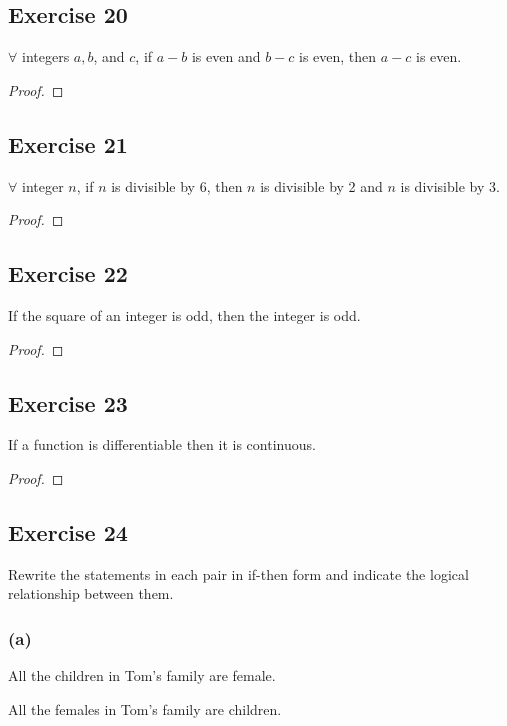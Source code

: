 \documentclass[14pt]{extarticle}
\newcommand{\fa}{\forall}
\begin{document}
\subsection{Exercise 20}
$\fa$ integers $a, b$, and $c$, if $a - b$ is even and $b - c$ is even, then $a - c$ is even.

\begin{proof}

\end{proof}

\subsection{Exercise 21}
$\fa$ integer $n$, if $n$ is divisible by 6, then $n$ is divisible by 2 and $n$ is divisible by 3.

\begin{proof}

\end{proof}

\subsection{Exercise 22}
If the square of an integer is odd, then the integer is odd.

\begin{proof}

\end{proof}

\subsection{Exercise 23}
If a function is differentiable then it is continuous.

\begin{proof}

\end{proof}

\subsection{Exercise 24}
Rewrite the statements in each pair in if-then form
and indicate the logical relationship between them.

\subsubsection{(a)}
All the children in Tom’s family are female. 

All the females in Tom’s family are children.
\end{document}

